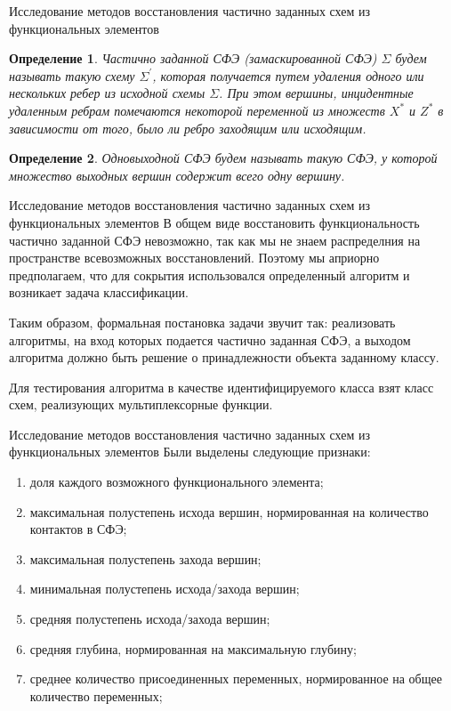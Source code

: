 \documentclass[serif,utf8]{beamer}
\newtheorem{mydef}{Определение}
\begin{document}
\begin{frame}{Исследование методов восстановления частично заданных схем из функциональных элементов}

\begin{mydef}
Частично заданной СФЭ (замаскированной СФЭ) $\Sigma$ будем называть такую схему $\Sigma^{'}$, которая получается путем удаления одного или нескольких ребер из исходной схемы $\Sigma$. При этом вершины, инцидентные удаленным ребрам помечаются некоторой переменной из множеств $X^{\ast}$ и $Z^{\ast}$ в зависимости от того, было ли ребро заходящим или исходящим.
\end{mydef}

\begin{mydef}
Одновыходной СФЭ будем называть такую СФЭ, у которой множество выходных вершин содержит всего одну вершину.
\end{mydef}

\end{frame}

\begin{frame}{Исследование методов восстановления частично заданных схем из функциональных элементов}
В общем виде восстановить функциональность частично заданной СФЭ невозможно, так как мы не знаем распределния на пространстве всевозможных восстановлений. Поэтому мы априорно предполагаем, что для сокрытия использовался определенный алгоритм и возникает задача классификации.\par
Таким образом, формальная постановка задачи звучит так: реализовать алгоритмы, на вход которых подается частично заданная СФЭ, а выходом алгоритма должно быть решение о принадлежности объекта заданному классу.\par
Для тестирования алгоритма в качестве идентифицируемого класса взят класс схем, реализующих мультиплексорные функции.
\end{frame}

\begin{frame}{Исследование методов восстановления частично заданных схем из функциональных элементов}
Были выделены следующие признаки:
\begin{enumerate}
\item доля каждого возможного функционального элемента;
\item максимальная полустепень исхода вершин, нормированная на количество контактов в СФЭ;
\item максимальная полустепень захода вершин;
\item минимальная полустепень исхода/захода вершин;
\item средняя полустепень исхода/захода вершин;
\item средняя глубина, нормированная на максимальную глубину;
\item среднее количество присоединенных переменных, нормированное на общее количество переменных;
\end{enumerate}
\end{frame}
\end{document}
